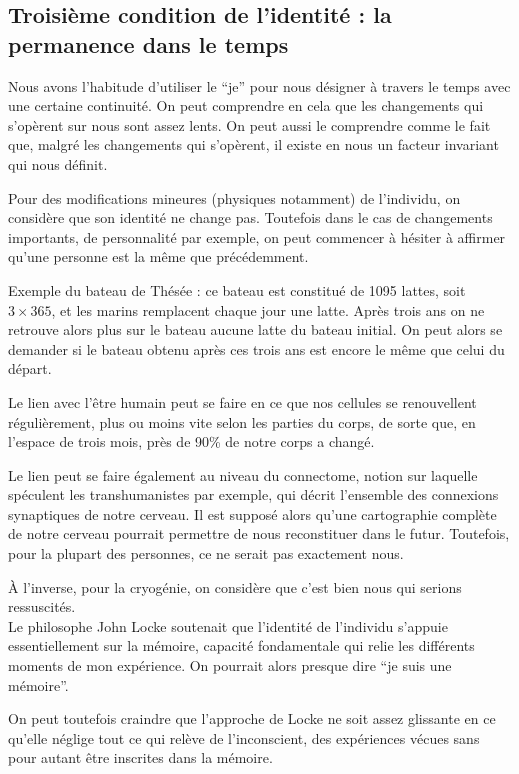 \subsection{Troisième condition de l'identité : la permanence dans le temps}
	Nous avons l'habitude d'utiliser le “je” pour nous désigner à travers le temps avec une certaine continuité.
	On peut comprendre en cela que les changements qui s'opèrent sur nous sont assez lents.
	On peut aussi le comprendre comme le fait que, malgré les changements qui s'opèrent, il existe en nous un facteur invariant qui nous définit.

	Pour des modifications mineures (physiques notamment) de l'individu, on considère que son identité ne change pas.
	Toutefois dans le cas de changements importants, de personnalité par exemple, on peut commencer à hésiter à affirmer qu'une personne est la même que précédemment.

	Exemple du bateau de Thésée : ce bateau est constitué de 1095 lattes, soit $3 \times 365$, et les marins remplacent chaque jour une latte.
	Après trois ans on ne retrouve alors plus sur le bateau aucune latte du bateau initial.
	On peut alors se demander si le bateau obtenu après ces trois ans est encore le même que celui du départ.

	Le lien avec l'être humain peut se faire en ce que nos cellules se renouvellent régulièrement, plus ou moins vite selon les parties du corps, de sorte que, en l'espace de trois mois, près de 90\% de notre corps a changé.


	Le lien peut se faire également au niveau du connectome, notion sur laquelle spéculent les transhumanistes par exemple, qui décrit l'ensemble des connexions synaptiques de notre cerveau.
	Il est supposé alors qu'une cartographie complète de notre cerveau pourrait permettre de nous reconstituer dans le futur.
	Toutefois, pour la plupart des personnes, ce ne serait pas exactement nous.

	À l'inverse, pour la cryogénie, on considère que c'est bien nous qui serions ressuscités.\\

	Le philosophe John Locke soutenait que l'identité de l'individu s'appuie essentiellement sur la mémoire, capacité fondamentale qui relie les différents moments de mon expérience.
	On pourrait alors presque dire “je suis une mémoire”.

	On peut toutefois craindre que l'approche de Locke ne soit assez glissante en ce qu'elle néglige tout ce qui relève de l'inconscient, des expériences vécues sans pour autant être inscrites dans la mémoire.

